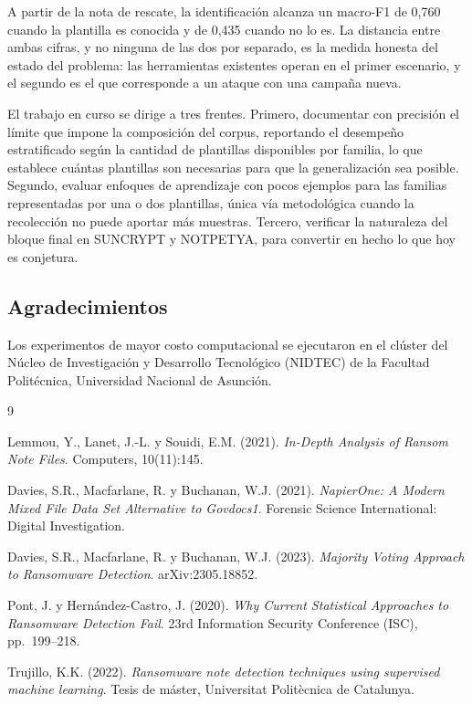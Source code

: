 \documentclass[11pt,a4paper]{article}
\begin{document}
A partir de la nota de rescate, la identificación alcanza un macro-F1 de 0,760 cuando la
plantilla es conocida y de 0,435 cuando no lo es. La distancia entre ambas cifras, y no
ninguna de las dos por separado, es la medida honesta del estado del problema: las
herramientas existentes operan en el primer escenario, y el segundo es el que corresponde a un
ataque con una campaña nueva.

El trabajo en curso se dirige a tres frentes. Primero, documentar con precisión el límite que
impone la composición del corpus, reportando el desempeño estratificado según la cantidad de
plantillas disponibles por familia, lo que establece cuántas plantillas son necesarias para que
la generalización sea posible. Segundo, evaluar enfoques de aprendizaje con pocos ejemplos para
las familias representadas por una o dos plantillas, única vía metodológica cuando la
recolección no puede aportar más muestras. Tercero, verificar la naturaleza del bloque final en
SUNCRYPT y NOTPETYA, para convertir en hecho lo que hoy es conjetura.

\subsection*{Agradecimientos}

Los experimentos de mayor costo computacional se ejecutaron en el clúster del Núcleo de
Investigación y Desarrollo Tecnológico (NIDTEC) de la Facultad Politécnica, Universidad
Nacional de Asunción.

\begin{thebibliography}{9}
\small

Lemmou, Y., Lanet, J.-L. y Souidi, E.M. (2021).
\textit{In-Depth Analysis of Ransom Note Files}.
Computers, 10(11):145.

Davies, S.R., Macfarlane, R. y Buchanan, W.J. (2021).
\textit{NapierOne: A Modern Mixed File Data Set Alternative to Govdocs1}.
Forensic Science International: Digital Investigation.

Davies, S.R., Macfarlane, R. y Buchanan, W.J. (2023).
\textit{Majority Voting Approach to Ransomware Detection}.
arXiv:2305.18852.

Pont, J. y Hernández-Castro, J. (2020).
\textit{Why Current Statistical Approaches to Ransomware Detection Fail}.
23rd Information Security Conference (ISC), pp.\ 199--218.

Trujillo, K.K. (2022).
\textit{Ransomware note detection techniques using supervised machine learning}.
Tesis de máster, Universitat Politècnica de Catalunya.

\end{thebibliography}
\end{document}
